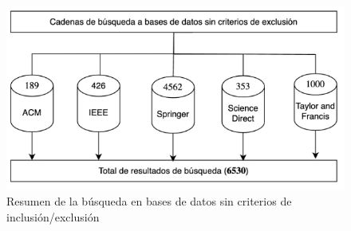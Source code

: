 \begin{figure}[H]
    \centering
    \includegraphics[scale=0.9]{tablas-images/cp2/bases-sin-criterio.png}
    \caption{Resumen de la búsqueda en bases de datos sin criterios de inclusión/exclusión}\label{fig:tabla-resumen-busqueda}
\end{figure}